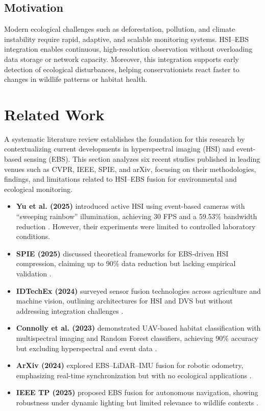 \documentclass[conference]{IEEEtran}
\begin{document}
\subsection{Motivation}
Modern ecological challenges such as deforestation, pollution, and climate instability require rapid, adaptive, and scalable monitoring systems. HSI–EBS integration enables continuous, high-resolution observation without overloading data storage or network capacity. Moreover, this integration supports early detection of ecological disturbances, helping conservationists react faster to changes in wildlife patterns or habitat health.

\section{Related Work}
A systematic literature review establishes the foundation for this research by contextualizing current developments in hyperspectral imaging (HSI) and event-based sensing (EBS). This section analyzes six recent studies published in leading venues such as CVPR, IEEE, SPIE, and arXiv, focusing on their methodologies, findings, and limitations related to HSI–EBS fusion for environmental and ecological monitoring.

\begin{itemize}
    \item \textbf{Yu et al. (2025)} introduced active HSI using event-based cameras with ``sweeping rainbow'' illumination, achieving 30 FPS and a 59.53\% bandwidth reduction \cite{yu2025active}. However, their experiments were limited to controlled laboratory conditions.
    \item \textbf{SPIE (2025)} discussed theoretical frameworks for EBS-driven HSI compression, claiming up to 90\% data reduction but lacking empirical validation \cite{spie2025}.
    \item \textbf{IDTechEx (2024)} surveyed sensor fusion technologies across agriculture and machine vision, outlining architectures for HSI and DVS but without addressing integration challenges \cite{idtechex2024}.
    \item \textbf{Connolly et al. (2023)} demonstrated UAV-based habitat classification with multispectral imaging and Random Forest classifiers, achieving 90\% accuracy but excluding hyperspectral and event data \cite{connolly2023}.
    \item \textbf{ArXiv (2024)} explored EBS–LiDAR–IMU fusion for robotic odometry, emphasizing real-time synchronization but with no ecological applications \cite{arxiv2024}.
    \item \textbf{IEEE TP (2025)} proposed EBS fusion for autonomous navigation, showing robustness under dynamic lighting but limited relevance to wildlife contexts \cite{ieee2025}.
\end{itemize}
\end{document}
